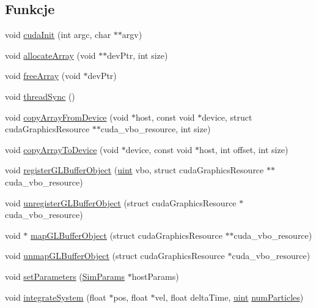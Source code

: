 \subsection*{Funkcje}
\begin{DoxyCompactItemize}
\item 
void \hyperlink{particle_system_8cuh_ad205012a960928f6fb61ea4f51a95e9f}{cuda\-Init} (int argc, char $\ast$$\ast$argv)
\item 
void \hyperlink{particle_system_8cuh_aee51e01a5233e0fda578bd5b3bc38e8f}{allocate\-Array} (void $\ast$$\ast$dev\-Ptr, int size)
\item 
void \hyperlink{particle_system_8cuh_a2946519c8d9c4f8ebf552bf044821ea9}{free\-Array} (void $\ast$dev\-Ptr)
\item 
void \hyperlink{particle_system_8cuh_af59f4c114812beed29874c0a1a31519d}{thread\-Sync} ()
\item 
void \hyperlink{particle_system_8cuh_a54716407dbd516db34f42b2faf7f91a3}{copy\-Array\-From\-Device} (void $\ast$host, const void $\ast$device, struct cuda\-Graphics\-Resource $\ast$$\ast$cuda\-\_\-vbo\-\_\-resource, int size)
\item 
void \hyperlink{particle_system_8cuh_ac4d4ecd921dbed6c2deef639ca295374}{copy\-Array\-To\-Device} (void $\ast$device, const void $\ast$host, int offset, int size)
\item 
void \hyperlink{particle_system_8cuh_a4386a84282ceeaba09939817aa2a9c24}{register\-G\-L\-Buffer\-Object} (\hyperlink{particles__kernel_8cuh_a91ad9478d81a7aaf2593e8d9c3d06a14}{uint} vbo, struct cuda\-Graphics\-Resource $\ast$$\ast$cuda\-\_\-vbo\-\_\-resource)
\item 
void \hyperlink{particle_system_8cuh_a9afef8c00ca779aae2d7484b45bce34c}{unregister\-G\-L\-Buffer\-Object} (struct cuda\-Graphics\-Resource $\ast$cuda\-\_\-vbo\-\_\-resource)
\item 
void $\ast$ \hyperlink{particle_system_8cuh_aa491077afd740a269815eb9ce81c8642}{map\-G\-L\-Buffer\-Object} (struct cuda\-Graphics\-Resource $\ast$$\ast$cuda\-\_\-vbo\-\_\-resource)
\item 
void \hyperlink{particle_system_8cuh_a98c3325419b7528d34a51ca7972d7095}{unmap\-G\-L\-Buffer\-Object} (struct cuda\-Graphics\-Resource $\ast$cuda\-\_\-vbo\-\_\-resource)
\item 
void \hyperlink{particle_system_8cuh_a342176dbaba2668312c45e1a1423fc4e}{set\-Parameters} (\hyperlink{struct_sim_params}{Sim\-Params} $\ast$host\-Params)
\item 
void \hyperlink{particle_system_8cuh_a34e9db8b801cd537e5ae5a4a886e020c}{integrate\-System} (float $\ast$pos, float $\ast$vel, float delta\-Time, \hyperlink{particles__kernel_8cuh_a91ad9478d81a7aaf2593e8d9c3d06a14}{uint} \hyperlink{particles_8cpp_a05b8a90212054a3eb1a036ae0c269596}{num\-Particles})
$$
\end{DoxyCompactItemize}
